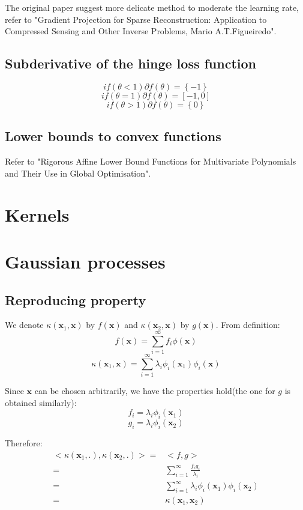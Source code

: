 \documentclass[UTF8]{ctexart}
\begin{document}
The original paper suggest more delicate method to moderate the learning rate, refer to "Gradient Projection for Sparse Reconstruction: Application to Compressed Sensing and Other Inverse Problems, Mario A.T.Figueiredo". 

\subsection{Subderivative of the hinge loss function}
$$if(\theta < 1) \partial f(\theta)=\left\{ -1 \right\}$$
$$if(\theta = 1) \partial f(\theta)=[ -1,0 ]$$
$$if(\theta > 1) \partial f(\theta)=\left\{ 0 \right\}$$

\subsection{Lower bounds to convex functions}
Refer to "Rigorous Affine Lower Bound Functions for Multivariate Polynomials and Their Use in Global Optimisation".

\newpage
\section{Kernels}


\newpage
\section{Gaussian processes}
\subsection{Reproducing property}
We denote $\kappa(\textbf{x}_{1},\textbf{x})$ by $f(\textbf{x})$ and $\kappa(\textbf{x}_{2},\textbf{x})$ by $g(\textbf{x})$. From definition:
$$f(\textbf{x})=\sum_{i=1}^{\infty}f_{i}\phi(\textbf{x})$$
$$\kappa(\textbf{x}_{1},\textbf{x})=\sum_{i=1}^{\infty}\lambda_{i}\phi_{i}(\textbf{x}_{1})\phi_{i}(\textbf{x})$$

Since $\textbf{x}$ can be chosen arbitrarily, we have the properties hold(the one for $g$ is obtained similarly):
$$f_{i}=\lambda_{i}\phi_{i}(\textbf{x}_{1})$$
$$g_{i}=\lambda_{i}\phi_{i}(\textbf{x}_{2})$$

Therefore:
\begin{align}
<\kappa(\textbf{x}_{1},.), \kappa(\textbf{x}_{2},.)> = & <f,g> \nonumber \\
=&\sum_{i=1}^{\infty}\frac{f_{i}g_{i}}{\lambda_{i}} \nonumber \\
=&\sum_{i=1}^{\infty}\lambda_{i}\phi_{i}(\textbf{x}_{1})\phi_{i}(\textbf{x}_{2}) \nonumber \\
=&\kappa(\textbf{x}_{1},\textbf{x}_{2}) \nonumber
\end{align}
\end{document}
